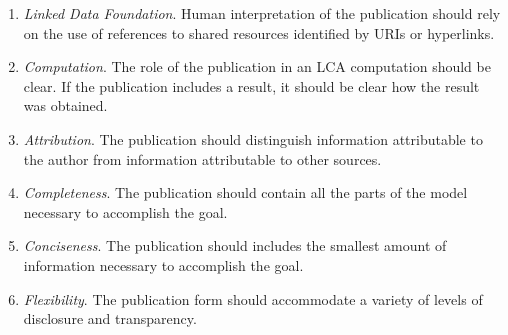 \begin{enumerate}
\item \emph{Linked Data Foundation}.  Human interpretation of the publication should rely on the use of references to shared resources identified by URIs or hyperlinks.
\item \emph{Computation}.  The role of the publication in an LCA computation should be clear.  If the publication includes a result, it should be clear how the result was obtained.
\item \emph{Attribution}.  The publication should distinguish information attributable to the author from information attributable to other sources.
\item \emph{Completeness}.  The publication should contain all the parts of the model necessary to accomplish the goal.  
\item \emph{Conciseness}.  The publication should includes the smallest amount of information necessary to accomplish the goal.
\item \emph{Flexibility}.  The publication form should accommodate a variety of levels of disclosure and transparency.
\end{enumerate}
